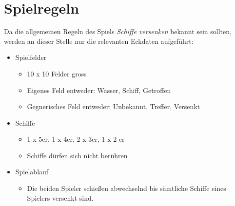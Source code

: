 \section{Spielregeln}
\label{sec:Spielregeln}

Da die allgemeinen Regeln des Spiels \textit{Schiffe versenken} bekannt sein sollten, werden an dieser Stelle nur die relevanten Eckdaten aufgeführt:


\begin{itemize}
	\item Spielfelder
		\begin{itemize}
			\item 10 x 10 Felder gross
			\item Eigenes Feld entweder: Wasser, Schiff, Getroffen
			\item Gegnerisches Feld entweder: Unbekannt, Treffer, Versenkt
		\end{itemize}
	\item Schiffe
		\begin{itemize}
			\item 1 x 5er, 1 x 4er, 2 x 3er, 1 x 2 er
			\item Schiffe dürfen sich nicht berühren
		\end{itemize}
	\item Spielablauf
		\begin{itemize}
			\item Die beiden Spieler schießen abwechselnd bis sämtliche Schiffe eines Spielers versenkt sind.
		\end{itemize}
	
\end{itemize}